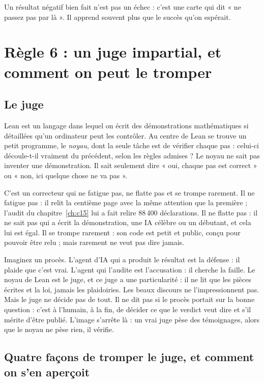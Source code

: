 Un résultat négatif bien fait n'est pas un échec : c'est une carte qui dit « ne passez pas par là ». Il apprend
souvent plus que le succès qu'on espérait.

\section{Règle 6 : un juge impartial, et comment on peut le tromper}

\subsection{Le juge}

Lean est un langage dans lequel on écrit des démonstrations mathématiques si détaillées qu'un ordinateur peut les
contrôler. Au centre de Lean se trouve un petit programme, le \emph{noyau}, dont la seule tâche est de vérifier
chaque pas : celui-ci découle-t-il vraiment du précédent, selon les règles admises ? Le noyau ne sait pas inventer une
démonstration. Il sait seulement dire « oui, chaque pas est correct » ou « non, ici quelque chose ne va pas ».

C'est un correcteur qui ne fatigue pas, ne flatte pas et se trompe rarement. Il ne fatigue pas : il relit la centième
page avec la même attention que la première ; l'audit du chapitre~\ref{ch:c15} lui a fait relire 88\,400
déclarations. Il ne flatte pas : il ne sait pas qui a écrit la démonstration, une IA célèbre ou un débutant, et cela
lui est égal. Il se trompe rarement : son code est petit et public, conçu pour pouvoir être relu ; mais rarement ne
veut pas dire jamais.

\begin{analogie}
Imaginez un procès. L'agent d'IA qui a produit le résultat est la défense : il plaide que c'est vrai. L'agent qui
l'audite est l'accusation : il cherche la faille. Le noyau de Lean est le juge, et ce juge a une particularité : il ne
lit que les pièces écrites et la loi, jamais les plaidoiries. Les beaux discours ne l'impressionnent pas. Mais le juge
ne décide pas de tout. Il ne dit pas si le procès portait sur la bonne question : c'est à l'humain, à la fin, de
décider ce que le verdict veut dire et s'il mérite d'être publié. L'image s'arrête là : un vrai juge pèse des
témoignages, alors que le noyau ne pèse rien, il vérifie.
\end{analogie}

\subsection{Quatre façons de tromper le juge, et comment on s'en aperçoit}

